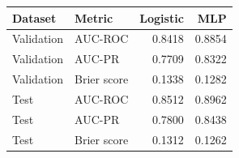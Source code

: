 \begin{tabular}{llrr}
\toprule
Dataset & Metric & Logistic & MLP \\
\midrule
Validation & AUC-ROC & 0.8418 & 0.8854 \\
Validation & AUC-PR & 0.7709 & 0.8322 \\
Validation & Brier score & 0.1338 & 0.1282 \\
Test & AUC-ROC & 0.8512 & 0.8962 \\
Test & AUC-PR & 0.7800 & 0.8438 \\
Test & Brier score & 0.1312 & 0.1262 \\
\bottomrule
\end{tabular}
